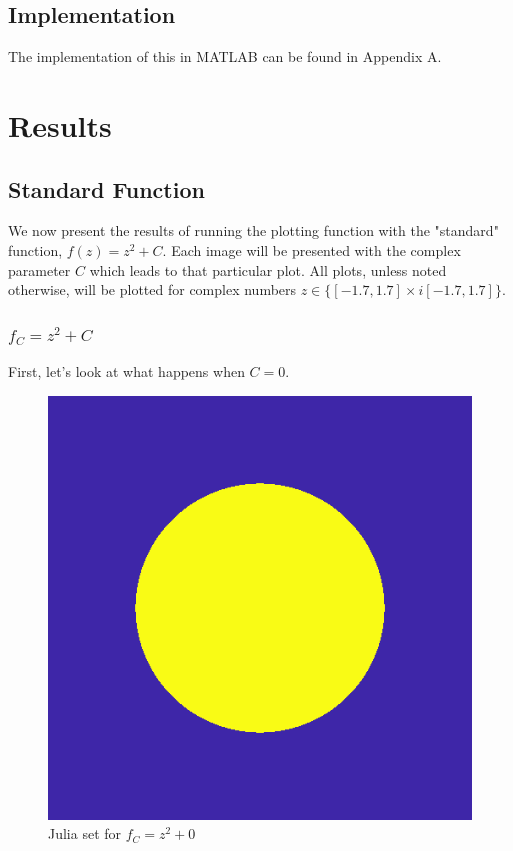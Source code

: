 \documentclass[12pt]{article}
\begin{document}
\subsection{Implementation}

The implementation of this in MATLAB can be found in Appendix A. 

\section{Results}

\subsection{Standard Function}

We now present the results of running the plotting function with the "standard" function, $f(z) = z^2 + C$. Each image will be presented with the complex parameter $C$ which leads to that particular plot. All plots, unless noted otherwise, will be plotted for complex numbers $z\in \{[-1.7, 1.7]\times i[-1.7, 1.7]\}$.

\subsubsection{$f_C = z^2 + C$}

First, let's look at what happens when $C = 0$.

\begin{figure}[H]
	\centering
	\includegraphics[scale=0.5]{Ceq0.png}
	\caption{Julia set for $f_C = z^2 + 0$}
\end{figure}
\end{document}
